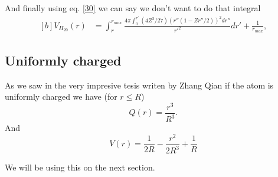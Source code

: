 \documentclass[12pt]{article}
\begin{document}
And finally using eq. \ref{30} we can say we don't want to do that integral
\begin{equation}
    \begin{aligned}[b]
     V_{H_{20}}(r)  &=\int^{r_{max}}_r \frac{4\pi \int_0^{r'}(4Z^3/27)(r''(1 - Zr''/2))^2dr''}{r'^2}dr' + \frac{1}{r_{max}}, %
    \end{aligned}
\end{equation}

\subsection{Uniformly charged}
As we saw in the very impresive tesis writen by Zhang Qian \cite{zhangQ} if the atom is uniformly charged we have (for $r\leq R$)
\begin{equation}
    Q(r) = \frac{r^3}{R^3}.
\end{equation}
And 
\begin{equation}
    V(r) = \frac{1}{2R} - \frac{r^2}{2R^3} + \frac{1}{R}
\end{equation}

We will be using this on the next section.
\end{document}

